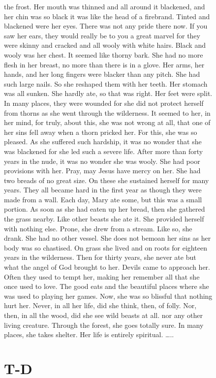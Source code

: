 \documentclass[
  letterpaper,
  DIV=11,
  numbers=noendperiod,
  oneside]{scrreprt}
\begin{document}
\begin{figure}
the frost. Her mouth was thinned and all around it blackened, and her
chin was so black it was like the head of a firebrand. Tinted and
blackened were her eyes. There was not any pride there now. If you saw
her ears, they would really be to you a great marvel for they were
skinny and cracked and all wooly with white hairs. Black and wooly was
her chest. It seemed like thorny bark. She had no more flesh in her
breast, no more than there is in a glove. Her arms, her hands, and her
long fingers were blacker than any pitch. She had such large nails. So
she reshaped them with her teeth. Her stomach was all sunken. She hardly
ate, so that was right. Her feet were split. In many places, they were
wounded for she did not protect herself from thorns as she went through
the wilderness. It seemed to her, in her mind, for truly, about this,
she was not wrong at all, that one of her sins fell away when a thorn
pricked her. For this, she was so pleased. As she suffered such
hardship, it was no wonder that she was blackened for she led such a
severe life. After more than forty years in the nude, it was no wonder
she was wooly. She had poor provisions with her. Pray, may Jesus have
mercy on her. She had two breads of no great size. On these she
sustained herself for many years. They all became hard in the first year
as though they were made from a wall. Each day, Mary ate some, but this
was a small portion. As soon as she had eaten up her bread, then she
gathered the grass nearby. Like other beasts she ate it. She provided
herself with nothing else. Prone, she drew from a stream. Like so, she
drank. She had no other vessel. She does not bemoan her sins as her body
was so chastised. On grass she lived and on roots for eighteen years in
the wilderness. Then for thirty years, she never ate but what the angel
of God brought to her. Devils came to approach her. Often they used to
tempt her, making her remember all that she once used to love. The good
eats and the beautiful places where she was used to playing her games.
Now, she was so blissful that nothing hurt her. Never, in all her life,
did she think, then, of folly. Nor, then, in all the wood, did she see
wild beasts at all. nor any other living creature. Through the forest,
she goes totally sure. In many places, she takes shelter. Her life is
entirely spiritual. \ldots..

\section{T-D}\label{t-d}


\end{figure}
\end{document}
